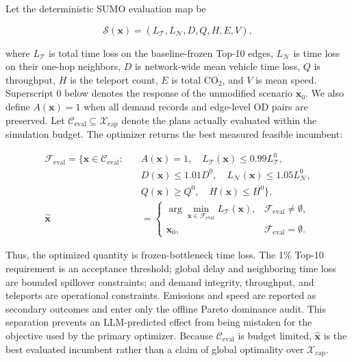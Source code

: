 \documentclass{trbunofficial}
\begin{document}
Let the deterministic SUMO evaluation map be

\begin{equation}
\mathcal{S}(\mathbf{x})=
\left(L_{\mathcal{T}},L_{\mathcal{N}},D,Q,H,E,V\right),
\label{eq:simulator-response}
\end{equation}

where $L_{\mathcal{T}}$ is total time loss on the baseline-frozen Top-10 edges,
$L_{\mathcal{N}}$ is time loss on their one-hop neighbors, $D$ is network-wide
mean vehicle time loss, $Q$ is throughput, $H$ is the teleport count, $E$ is
total $\mathrm{CO}_2$, and $V$ is mean speed.  Superscript $0$ below denotes
the response of the unmodified scenario $\mathbf{x}_0$.  We also define
$A(\mathbf{x})=1$ when all demand records and edge-level OD pairs are
preserved.  Let $\mathcal{C}_{\mathrm{eval}}\subseteq
\mathcal{X}_{\mathrm{cap}}$ denote the plans actually evaluated within the
simulation budget.  The optimizer returns the best measured feasible incumbent:

\begin{equation}
\begin{aligned}
\mathcal{F}_{\mathrm{eval}}=\{\mathbf{x}\in\mathcal{C}_{\mathrm{eval}}:\quad
&A(\mathbf{x})=1,\quad
L_{\mathcal{T}}(\mathbf{x})\leq0.99L_{\mathcal{T}}^0,\\
&D(\mathbf{x})\leq1.01D^0,\quad
L_{\mathcal{N}}(\mathbf{x})\leq1.05L_{\mathcal{N}}^0,\\
&Q(\mathbf{x})\geq Q^0,\quad H(\mathbf{x})\leq H^0\},\\
\hat{\mathbf{x}}&=
\begin{cases}
\arg\min_{\mathbf{x}\in\mathcal{F}_{\mathrm{eval}}}L_{\mathcal{T}}(\mathbf{x}),
&\mathcal{F}_{\mathrm{eval}}\neq\emptyset,\\
\mathbf{x}_0,&\mathcal{F}_{\mathrm{eval}}=\emptyset.
\end{cases}
\end{aligned}
\label{eq:top10-constrained-selection}
\end{equation}

Thus, the optimized quantity is frozen-bottleneck time loss.  The 1\% Top-10
requirement is an acceptance threshold; global delay and neighboring time loss
are bounded spillover constraints; and demand integrity, throughput, and
teleports are operational constraints.  Emissions and speed are reported as
secondary outcomes and enter only the offline Pareto dominance audit.  This
separation prevents an LLM-predicted effect from being mistaken for the
objective used by the primary optimizer.  Because
$\mathcal{C}_{\mathrm{eval}}$ is budget limited, $\hat{\mathbf{x}}$ is the best
evaluated incumbent rather than a claim of global optimality over
$\mathcal{X}_{\mathrm{cap}}$.
\end{document}
